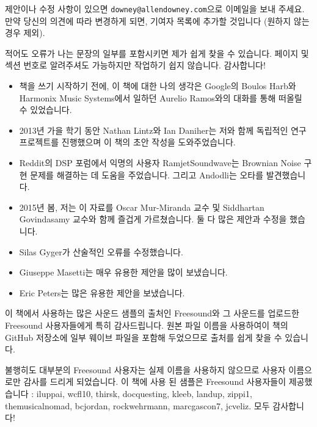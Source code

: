 \documentclass[12pt]{book} \usepackage[width=5.5in,height=8.5in, hmarginratio=3:2,vmarginratio=1:1]{geometry}
\begin{document}
제안이나 수정 사항이 있으면 {\tt downey@allendowney.com}으로 이메일을 보내 주세요. 만약 당신의 의견에 따라 변경하게 되면, 기여자 목록에 추가할 것입니다 (원하지 않는 경우 제외).  

적어도 오류가 나는 문장의 일부를 포함시키면 제가 쉽게 찾을 수 있습니다. 페이지 및 섹션 번호로 알려주셔도 가능하지만 작업하기 쉽지 않습니다. 감사합니다! 

\small

\begin{itemize} 

\item 책을 쓰기 시작하기 전에, 이 책에 대한 나의 생각은 Google의 Boulos Harb와 Harmonix Music Systems에서 일하던 Aurelio Ramos와의 대화를 통해 떠올릴 수 있었습니다. 

\item 2013년 가을 학기 동안 Nathan Lintz와 Ian Daniher는 저와 함께 독립적인 연구 프로젝트를 진행했으며 이 책의 초안 작성을 도와주었습니다. 

\item Reddit의 DSP 포럼에서 익명의 사용자 RamjetSoundwave는 Brownian Noise 구현 문제를 해결하는 데 도움을 주었습니다. 그리고 Andodli는 오타를 발견했습니다. 

\item 2015년 봄, 저는 이 자료를 Oscar Mur-Miranda 교수 및 Siddhartan Govindasamy 교수와 함께 즐겁게 가르쳤습니다. 둘 다 많은 제안과 수정을 했습니다. 

\item Silas Gyger가 산술적인 오류를 수정했습니다. 

\item Giuseppe Masetti는 매우 유용한 제안을 많이 보냈습니다. 

\item Eric Peters는 많은 유용한 제안을 보냈습니다. 

\end{itemize} 

이 책에서 사용하는 많은 사운드 샘플의 출처인 Freesound와 그 사운드를 업로드한 Freesound 사용자들에게 특히 감사드립니다. 원본 파일 이름을 사용하여이 책의 GitHub 저장소에 일부 웨이브 파일을 포함해 두었으므로 출처를 쉽게 찾을 수 있습니다. 

불행히도 대부분의 Freesound 사용자는 실제 이름을 사용하지 않으므로 사용자 이름으로만 감사를 드리게 되었습니다. 이 책에 사용 된 샘플은 Freesound 사용자들이 제공했습니다 : iluppai, wcfl10, thirsk, docquesting, kleeb, landup, zippi1, themusicalnomad, bcjordan, rockwehrmann, marcgascon7, jcveliz. 모두 감사합니다! 
\end{document}
